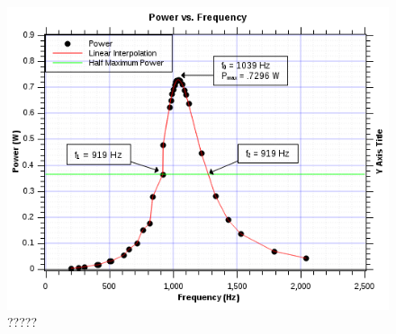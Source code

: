 \documentclass[twocolumn,english]{IEEEtran}
\theoremstyle{plain}
\theoremstyle{plain}
\begin{document}
\begin{figure}[h!]
	\begin{centering}
	\begin{center}
	\includegraphics[width=\linewidth]{./Part8.png}
	\caption{?????}
	\label{fig:??????}
	\end{center}
	\par\end{centering}
\end{figure}


%
%
\end{document}
